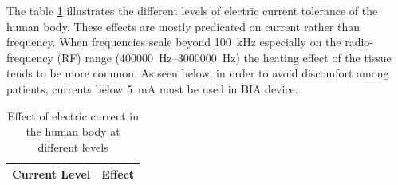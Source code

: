 The table \ref{table:current in body} illustrates the different levels of electric current tolerance of the human body. These effects are mostly predicated on current rather than frequency. When frequencies scale beyond \SI{100}{\kilo\hertz} especially on the radio-frequency (RF) range (\SIrange[scientific-notation = engineering]{400000}{3000000}{\hertz}) the heating effect of the tissue tends to be more common. As seen below, in order to avoid discomfort among patients, currents below \SI{5}{\milli\ampere} must be used in BIA device.

\begin{table}[!htpb]
	\caption[Effect of electric current in the human body]{Effect of electric current in the human body at different levels}
	\centering
	\label{table:current in body}
	\begin{tabular}{lp{}}
		\toprule
		\textbf{Current Level}                &         \textbf{Effect}          \\ \midrule
		

\end{tabular}
\end{table}

